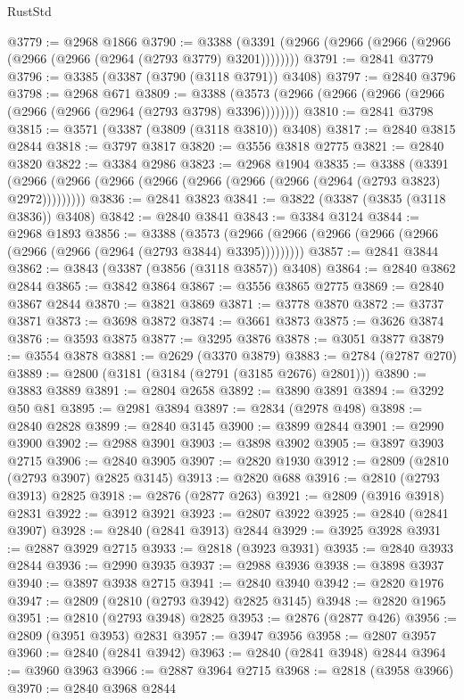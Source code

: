 \begin{lexlean}{RustStd}
\begin{coremodule}
@3779 := @2968 @1866
@3790 := @3388 (@3391 (@2966 (@2966 (@2966 (@2966 (@2966 (@2966 (@2964 (@2793 @3779) @3201))))))))
@3791 := @2841 @3779
@3796 := @3385 (@3387 (@3790 (@3118 @3791)) @3408)
@3797 := @2840 @3796
@3798 := @2968 @671
@3809 := @3388 (@3573 (@2966 (@2966 (@2966 (@2966 (@2966 (@2966 (@2964 (@2793 @3798) @3396))))))))
@3810 := @2841 @3798
@3815 := @3571 (@3387 (@3809 (@3118 @3810)) @3408)
@3817 := @2840 @3815 @2844
@3818 := @3797 @3817
@3820 := @3556 @3818 @2775
@3821 := @2840 @3820
@3822 := @3384 @2986
@3823 := @2968 @1904
@3835 := @3388
    (@3391 (@2966 (@2966 (@2966 (@2966 (@2966 (@2966 (@2966 (@2964 (@2793 @3823) @2972)))))))))
@3836 := @2841 @3823
@3841 := @3822 (@3387 (@3835 (@3118 @3836)) @3408)
@3842 := @2840 @3841
@3843 := @3384 @3124
@3844 := @2968 @1893
@3856 := @3388
    (@3573 (@2966 (@2966 (@2966 (@2966 (@2966 (@2966 (@2966 (@2964 (@2793 @3844) @3395)))))))))
@3857 := @2841 @3844
@3862 := @3843 (@3387 (@3856 (@3118 @3857)) @3408)
@3864 := @2840 @3862 @2844
@3865 := @3842 @3864
@3867 := @3556 @3865 @2775
@3869 := @2840 @3867 @2844
@3870 := @3821 @3869
@3871 := @3778 @3870
@3872 := @3737 @3871
@3873 := @3698 @3872
@3874 := @3661 @3873
@3875 := @3626 @3874
@3876 := @3593 @3875
@3877 := @3295 @3876
@3878 := @3051 @3877
@3879 := @3554 @3878
@3881 := @2629 (@3370 @3879)
@3883 := @2784 (@2787 @270)
@3889 := @2800 (@3181 (@3184 (@2791 (@3185 @2676) @2801)))
@3890 := @3883 @3889
@3891 := @2804 @2658
@3892 := @3890 @3891
@3894 := @3292 @50 @81
@3895 := @2981 @3894
@3897 := @2834 (@2978 @498)
@3898 := @2840 @2828
@3899 := @2840 @3145
@3900 := @3899 @2844
@3901 := @2990 @3900
@3902 := @2988 @3901
@3903 := @3898 @3902
@3905 := @3897 @3903 @2715
@3906 := @2840 @3905
@3907 := @2820 @1930
@3912 := @2809 (@2810 (@2793 @3907) @2825 @3145)
@3913 := @2820 @688
@3916 := @2810 (@2793 @3913) @2825
@3918 := @2876 (@2877 @263)
@3921 := @2809 (@3916 @3918) @2831
@3922 := @3912 @3921
@3923 := @2807 @3922
@3925 := @2840 (@2841 @3907)
@3928 := @2840 (@2841 @3913) @2844
@3929 := @3925 @3928
@3931 := @2887 @3929 @2715
@3933 := @2818 (@3923 @3931)
@3935 := @2840 @3933 @2844
@3936 := @2990 @3935
@3937 := @2988 @3936
@3938 := @3898 @3937
@3940 := @3897 @3938 @2715
@3941 := @2840 @3940
@3942 := @2820 @1976
@3947 := @2809 (@2810 (@2793 @3942) @2825 @3145)
@3948 := @2820 @1965
@3951 := @2810 (@2793 @3948) @2825
@3953 := @2876 (@2877 @426)
@3956 := @2809 (@3951 @3953) @2831
@3957 := @3947 @3956
@3958 := @2807 @3957
@3960 := @2840 (@2841 @3942)
@3963 := @2840 (@2841 @3948) @2844
@3964 := @3960 @3963
@3966 := @2887 @3964 @2715
@3968 := @2818 (@3958 @3966)
@3970 := @2840 @3968 @2844

\end{coremodule}
\end{lexlean}
